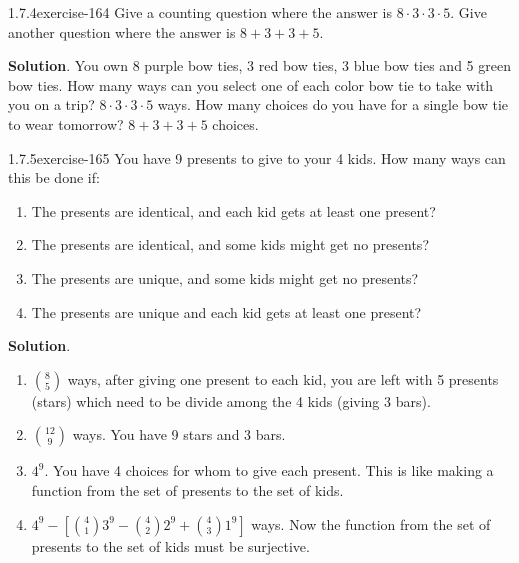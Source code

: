 \documentclass[twoside,11pt,]{book}
\numberwithin{equation}{chapter}
\begin{document}
\begin{divisionsolution}{1.7.4}{}{exercise-164}%
\hypertarget{p-2678}{}%
Give a counting question where the answer is \(8\cdot 3 \cdot 3 \cdot 5\). Give another question where the answer is \(8 + 3 + 3 + 5\).%
\par\smallskip%
\noindent\textbf{Solution}.\quad%
\hypertarget{p-2679}{}%
You own 8 purple bow ties,  3 red bow ties, 3 blue bow ties and 5 green bow ties. How many ways can you select one of each color bow tie to take with you on a trip? \(8 \cdot 3 \cdot 3 \cdot 5\) ways. How many choices do you have for a single bow tie to wear tomorrow? \(8 + 3 + 3 + 5\) choices.%
\end{divisionsolution}%
\begin{divisionsolution}{1.7.5}{}{exercise-165}%
\hypertarget{p-2690}{}%
You have 9 presents to give to your 4 kids. How many ways can this be done if:\leavevmode%
\begin{enumerate}[label=(\alph*)]
\item\hypertarget{li-1600}{}\hypertarget{p-2691}{}%
The presents are identical, and each kid gets at least one present?%
\item\hypertarget{li-1601}{}\hypertarget{p-2693}{}%
The presents are identical, and some kids might get no presents?%
\item\hypertarget{li-1602}{}\hypertarget{p-2695}{}%
The presents are unique, and some kids might get no presents?%
\item\hypertarget{li-1603}{}\hypertarget{p-2697}{}%
The presents are unique and each kid gets at least one present?%
\end{enumerate}
%
\par\smallskip%
\noindent\textbf{Solution}.\quad%
\hypertarget{p-2699}{}%
\leavevmode%
\begin{enumerate}[label=(\alph*)]
\item\hypertarget{li-1604}{}\hypertarget{p-2700}{}%
\({8 \choose 5}\) ways, after giving one present to each kid, you are left with 5 presents (stars) which need to be divide among the 4 kids (giving 3 bars).%
\item\hypertarget{li-1605}{}\hypertarget{p-2701}{}%
\({12 \choose 9}\) ways. You have 9 stars and 3 bars.%
\item\hypertarget{li-1606}{}\hypertarget{p-2702}{}%
\(4^9\text{.}\) You have 4 choices for whom to give each present. This is like making a function from the set of presents to the set of kids.%
\item\hypertarget{li-1607}{}\hypertarget{p-2703}{}%
\(4^9 - \left[{4 \choose 1}3^9 - {4\choose 2}2^9 + {4 \choose 3}1^9 \right]\) ways. Now the function from the set of presents to the set of kids must be surjective.%
\end{enumerate}
%
\end{divisionsolution}%
\end{document}
